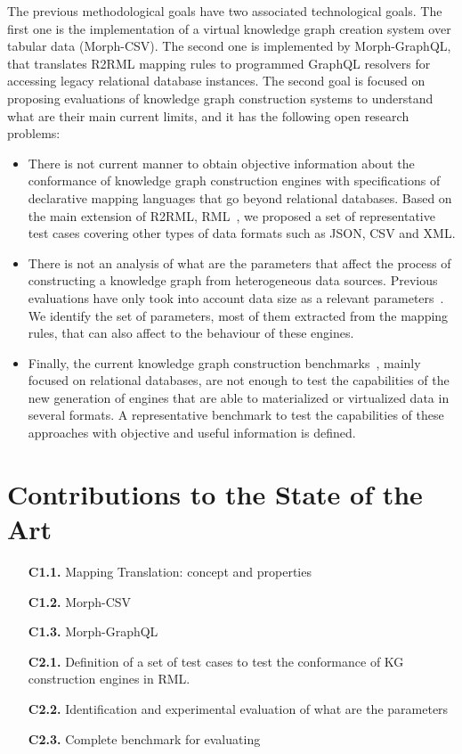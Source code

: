 The previous methodological goals have two associated technological goals. The first one is the implementation of a virtual knowledge graph creation system over tabular data (Morph-CSV). The second one is implemented by Morph-GraphQL, that translates R2RML mapping rules to programmed GraphQL resolvers for accessing legacy relational database instances.
The second goal is focused on proposing evaluations of knowledge graph construction systems to understand what are their main current limits, and it has the following open research problems:
\begin{itemize}
    \item There is not current manner to obtain objective information about the conformance of knowledge graph construction engines with specifications of declarative mapping languages that go beyond relational databases. Based on the main extension of R2RML, RML~\citep{dimou2014rml}, we proposed a set of representative test cases covering other types of data formats such as JSON, CSV and XML.
    \item There is not an analysis of what are the parameters that affect the process of constructing a knowledge graph from heterogeneous data sources. Previous evaluations have only took into account data size as a relevant parameters~\citep{lefranccois2017sparql,csimcsek2019rocketrml}. We identify the set of parameters, most of them extracted from the mapping rules, that can also affect to the behaviour of these engines.
    \item Finally, the current knowledge graph construction benchmarks~\citep{lanti2015npd,bizer2009berlin}, mainly focused on relational databases, are not enough to test the capabilities of the new generation of engines that are able to materialized or virtualized data in several formats. A representative benchmark to test the capabilities of these approaches with objective and useful information is defined.
\end{itemize}



\section{Contributions to the State of the Art}


\begin{enumerate}
    \item[\textbf{C1.1.}]  Mapping Translation: concept and properties
    \item[\textbf{C1.2.}] Morph-CSV 
    \item[\textbf{C1.3.}] Morph-GraphQL
    \item[\textbf{C2.1.}] Definition of a set of test cases to test the conformance of KG construction engines in RML.
    \item[\textbf{C2.2.}] Identification and experimental evaluation of what are the parameters
    \item[\textbf{C2.3.}] Complete benchmark for evaluating
\end{enumerate}

